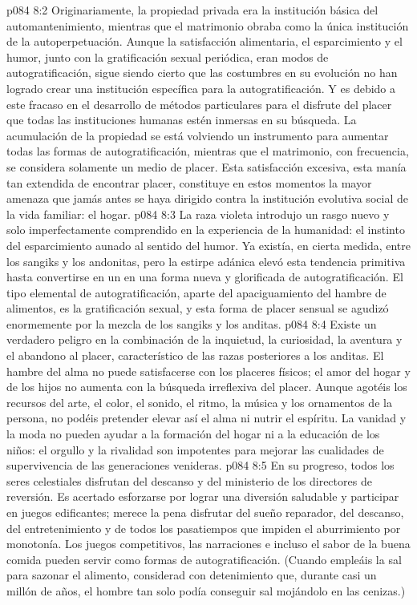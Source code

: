 \vs p084 8:2 Originariamente, la propiedad privada era la institución básica del automantenimiento, mientras que el matrimonio obraba como la única institución de la autoperpetuación. Aunque la satisfacción alimentaria, el esparcimiento y el humor, junto con la gratificación sexual periódica, eran modos de autogratificación, sigue siendo cierto que las costumbres en su evolución no han logrado crear una institución específica para la autogratificación. Y es debido a este fracaso en el desarrollo de métodos particulares para el disfrute del placer que todas las instituciones humanas estén inmersas en su búsqueda. La acumulación de la propiedad se está volviendo un instrumento para aumentar todas las formas de autogratificación, mientras que el matrimonio, con frecuencia, se considera solamente un medio de placer. Esta satisfacción excesiva, esta manía tan extendida de encontrar placer, constituye en estos momentos la mayor amenaza que jamás antes se haya dirigido contra la institución evolutiva social de la vida familiar: el hogar.
\vs p084 8:3 La raza violeta introdujo un rasgo nuevo y solo imperfectamente comprendido en la experiencia de la humanidad: el instinto del esparcimiento aunado al sentido del humor. Ya existía, en cierta medida, entre los sangiks y los andonitas, pero la estirpe adánica elevó esta tendencia primitiva hasta convertirse en un  en una forma nueva y glorificada de autogratificación. El tipo elemental de autogratificación, aparte del apaciguamiento del hambre de alimentos, es la gratificación sexual, y esta forma de placer sensual se agudizó enormemente por la mezcla de los sangiks y los anditas.
\vs p084 8:4 Existe un verdadero peligro en la combinación de la inquietud, la curiosidad, la aventura y el abandono al placer, característico de las razas posteriores a los anditas. El hambre del alma no puede satisfacerse con los placeres físicos; el amor del hogar y de los hijos no aumenta con la búsqueda irreflexiva del placer. Aunque agotéis los recursos del arte, el color, el sonido, el ritmo, la música y los ornamentos de la persona, no podéis pretender elevar así el alma ni nutrir el espíritu. La vanidad y la moda no pueden ayudar a la formación del hogar ni a la educación de los niños: el orgullo y la rivalidad son impotentes para mejorar las cualidades de supervivencia de las generaciones venideras.
\vs p084 8:5 En su progreso, todos los seres celestiales disfrutan del descanso y del ministerio de los directores de reversión. Es acertado esforzarse por lograr una diversión saludable y participar en juegos edificantes; merece la pena disfrutar del sueño reparador, del descanso, del entretenimiento y de todos los pasatiempos que impiden el aburrimiento por monotonía. Los juegos competitivos, las narraciones e incluso el sabor de la buena comida pueden servir como formas de autogratificación. (Cuando empleáis la sal para sazonar el alimento, considerad con detenimiento que, durante casi un millón de años, el hombre tan solo podía conseguir sal mojándolo en las cenizas.)
